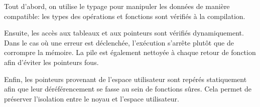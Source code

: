 Tout d'abord, on utilise le typage pour manipuler les données de manière
compatible: les types des opérations et fonctions sont vérifiés à la
compilation.

Ensuite, les accès aux tableaux et aux pointeurs sont vérifiés dynamiquement.
Dans le cas où une erreur est déclenchée, l'exécution s'arrête plutôt que de
corrompre la mémoire. La pile est également nettoyée à chaque retour de fonction
afin d'éviter les pointeurs fous.

Enfin, les pointeurs provenant de l'espace utilisateur sont repérés statiquement
afin que leur déréférencement se fasse au sein de fonctions sûres. Cela permet
de préserver l'isolation entre le noyau et l'espace utilisateur.

